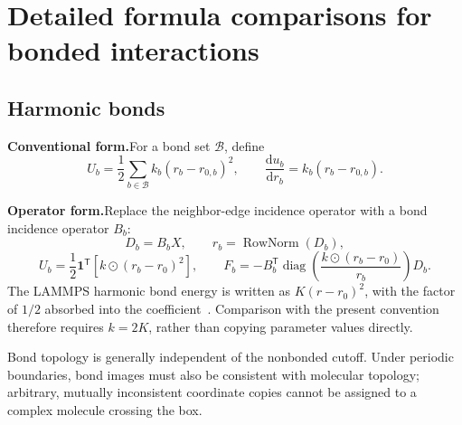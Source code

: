 \documentclass[11pt,a4paper]{article}
\newcommand{\oldform}{\par\noindent\textbf{Conventional form.}\quad}
\newcommand{\newform}{\par\noindent\textbf{Operator form.}\quad}
\newcommand{\ones}{\mathbf 1}
\newcommand{\dd}{\mathrm d}
\newcommand{\diag}{\operatorname{diag}}
\theoremstyle{definition}
\begin{document}
\section{Detailed formula comparisons for bonded interactions}
\label{app:bonded}
\subsection{Harmonic bonds}
\oldform For a bond set $\mathcal B$, define
\begin{equation}
U_b=\frac12\sum_{b\in\mathcal B}k_b(r_b-r_{0,b})^2,
\qquad
\frac{\dd u_b}{\dd r_b}=k_b(r_b-r_{0,b}).
\end{equation}
\newform Replace the neighbor-edge incidence operator with a bond incidence operator $B_b$:
\begin{equation}
D_b=B_bX,\qquad r_b=\operatorname{RowNorm}(D_b),
\end{equation}
\begin{equation}
U_b=\frac12\ones^{\mathsf T}\!\left[k\odot(r_b-r_0)^2\right],\qquad
F_b=-B_b^{\mathsf T}\diag\!\left(\frac{k\odot(r_b-r_0)}{r_b}\right)D_b.
\end{equation}
The LAMMPS harmonic bond energy is written as $K(r-r_0)^2$, with the factor of $1/2$ absorbed
into the coefficient~\cite{lammps-bond}. Comparison with the present convention therefore
requires $k=2K$, rather than copying parameter values directly.

Bond topology is generally independent of the nonbonded cutoff. Under periodic boundaries, bond
images must also be consistent with molecular topology; arbitrary, mutually inconsistent
coordinate copies cannot be assigned to a complex molecule crossing the box.
\end{document}
